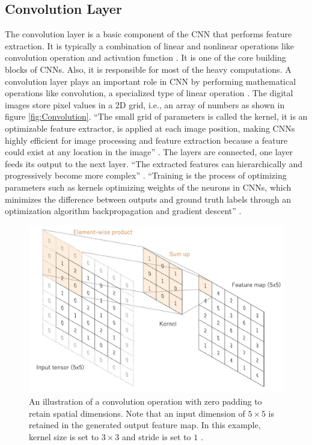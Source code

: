 \subsection{Convolution Layer}
The convolution layer is a basic component of the \ac{CNN} that performs feature extraction. It is typically a combination of linear and nonlinear operations like convolution operation and activation function \cite{articleCNNs}. It is one of the core building blocks of \acp{CNN}. Also, it is responsible for most of the heavy computations. A convolution layer plays an important role in \ac{CNN} by performing mathematical operations like convolution, a specialized type of linear operation \cite{articleCNNs}. The digital images store pixel values in a \ac{2D} grid, i.e., an array of numbers as shown in figure \ref{fig:Convolution}. ``The small grid of parameters is called the kernel, it is an optimizable feature extractor, is applied at each image position, making \acp{CNN} highly efficient for image processing and feature extraction because a feature could exist at any location in the image'' \cite{articleCNNs}. The layers are connected, one layer feeds its output to the next layer. ``The extracted features can hierarchically and progressively become more complex'' \cite{articleCNNs}. ``Training is the process of optimizing parameters such as kernels optimizing weights of the neurons in \acp{CNN}, which minimizes the difference between outputs and ground truth labels through an optimization algorithm backpropagation and gradient descent'' \cite{Goodfellow-et-al-2016} \cite{ruder2017overview} \cite{articleCNNs}.



\begin{figure}[H]
        \begin{center}
	    \includegraphics[scale=0.60]{images/Fundamentals/ConvolutionZeroPadding.JPG}
	    \caption[A Convolution Operation With Zero Padding.]{An illustration of a convolution operation with zero padding to retain spatial dimensions. Note that an input dimension of $5 \times 5$ is retained in the generated output feature map. In this example, kernel size is set to $3 \times 3$ and stride is set to $1$ \cite{articleCNNs}.}
	    \label{fig:ConvolutionZeroPadding}
	    \end{center}
\end{figure}

